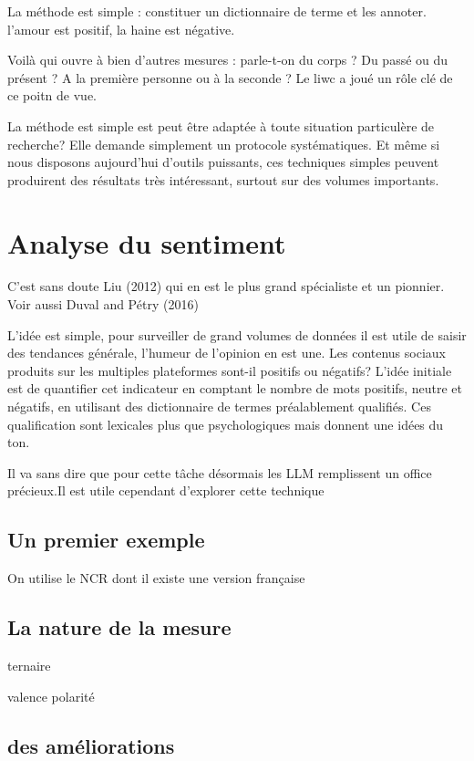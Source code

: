 \documentclass[
  letterpaper,
  DIV=11,
  numbers=noendperiod]{scrreprt}
\begin{document}
La méthode est simple : constituer un dictionnaire de terme et les
annoter. l'amour est positif, la haine est négative.

Voilà qui ouvre à bien d'autres mesures : parle-t-on du corps ? Du passé
ou du présent ? A la première personne ou à la seconde ? Le liwc a joué
un rôle clé de ce poitn de vue.

La méthode est simple est peut être adaptée à toute situation
particulère de recherche? Elle demande simplement un protocole
systématiques. Et même si nous disposons aujourd'hui d'outils puissants,
ces techniques simples peuvent produirent des résultats très
intéressant, surtout sur des volumes importants.

\section{Analyse du sentiment}\label{analyse-du-sentiment}

C'est sans doute Liu (2012) qui en est le plus grand spécialiste et un
pionnier. Voir aussi Duval and Pétry (2016)

L'idée est simple, pour surveiller de grand volumes de données il est
utile de saisir des tendances générale, l'humeur de l'opinion en est
une. Les contenus sociaux produits sur les multiples plateformes sont-il
positifs ou négatifs? L'idée initiale est de quantifier cet indicateur
en comptant le nombre de mots positifs, neutre et négatifs, en utilisant
des dictionnaire de termes préalablement qualifiés. Ces qualification
sont lexicales plus que psychologiques mais donnent une idées du ton.

Il va sans dire que pour cette tâche désormais les LLM remplissent un
office précieux.Il est utile cependant d'explorer cette technique

\subsection{Un premier exemple}\label{un-premier-exemple}

On utilise le NCR dont il existe une version française

\subsection{La nature de la mesure}\label{la-nature-de-la-mesure}

ternaire

valence polarité

\subsection{des améliorations}\label{des-amuxe9liorations}
\end{document}
